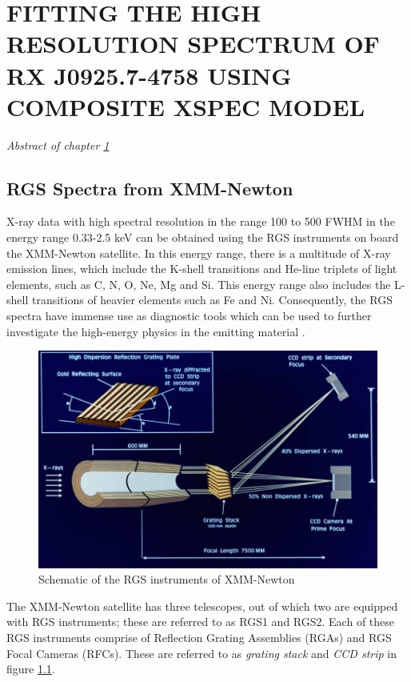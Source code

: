 \chapter{FITTING THE HIGH RESOLUTION SPECTRUM OF RX J0925.7-4758 USING COMPOSITE XSPEC MODEL} \label{chap:hi-resolution}
    \minitoc
    \emph{Abstract of chapter \ref{chap:hi-resolution}}

	\section{RGS Spectra from XMM-Newton} \label{hi-resolution:rgs-spec}
		X-ray data with high spectral resolution in the range 100 to 500 FWHM in the energy range 0.33-2.5 keV can be obtained using the RGS instruments on board the XMM-Newton satellite. In this energy range, there is a multitude of X-ray emission lines, which include the K-shell transitions and He-line triplets of light elements, such as C, N, O, Ne, Mg and Si. This energy range also includes the L-shell transitions of heavier elements such as Fe and Ni. Consequently, the RGS spectra have immense use as diagnostic tools which can be used to further investigate the high-energy physics in the emitting material \cite{xmmUserHandbook}.
		
		\begin{figure}[h!]
			\centering
			\caption{Schematic of the RGS instruments of XMM-Newton}
			\label{xmm-rgs-instrument}
			\includegraphics[scale=0.35]{xmm-rgs.png}
		\end{figure}
		
		The XMM-Newton satellite has three telescopes, out of which two are equipped with RGS instruments; these are referred to as RGS1 and RGS2. Each of these RGS instruments comprise of Reflection Grating Assemblies (RGAs) and RGS Focal Cameras (RFCs). These are referred to as \emph{grating stack} and \emph{CCD strip} in figure \ref{xmm-rgs-instrument}.
		
